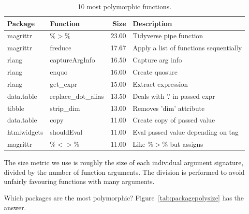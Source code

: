 \documentclass[acmsmall,10pt,review,anonymous]{acmart}\settopmatter{printfolios=true,printccs=false,printacmref=false}
\begin{document}
\begin{table}[ht]
\label{tab:bigpolyfuns}
\centering
\begin{tabular}{llrl}
  \hline
Package & Function & Size & Description \\ 
  \hline
magrittr & \%$>$\% & 23.00 & Tidyverse pipe function \\ 
  magrittr & freduce & 17.67 & Apply a list of functions sequentially \\ 
  rlang & captureArgInfo & 16.50 & Capture arg info \\ 
  rlang & enquo & 16.00 & Create quosure \\ 
  rlang & get\_expr & 15.00 & Extract expression \\ 
  data.table & replace\_dot\_alias & 13.50 & Deals with '.' in passed expr \\ 
  tibble & strip\_dim & 13.00 & Removes 'dim' attribute \\ 
  data.table & copy & 11.00 & Create copy of passed value \\ 
  htmlwidgets & shouldEval & 11.00 & Eval passed value depending on tag \\ 
  magrittr & \%$<$$>$\% & 11.00 & Like \%$>$\% but assigns \\ 
   \hline
\end{tabular}
\caption{10 most polymorphic functions.}
\end{table}

The size metric we use is roughly the size of each individual argument signature, divided by the number of function arguments.
The division is performed to avoid unfairly favouring functions with many arguments.

Which packages are the most polymorphic?
Figure~\ref{tab:packagepolysize} has the answer.
\end{document}
